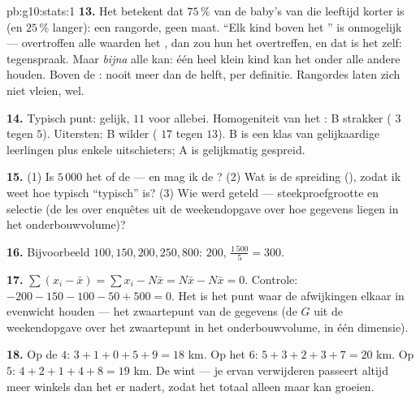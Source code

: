 \begin{solution}{pb:g10:stats:1}
\textbf{13.} Het betekent dat $75\,\%$ van de baby's van die leeftijd korter
is (en $25\,\%$ langer): een rangorde, geen maat. ``Elk kind boven het
'' is onmogelijk --- overtroffen alle waarden het , dan
zou hun  het  overtreffen, en dat is het zelf:
tegenspraak. Maar \emph{bijna} alle kan: één heel klein kind kan het
 onder alle andere houden. Boven de \emph{}: nooit meer dan
de helft, per definitie. Rangordes laten zich niet vleien,  wel.

\textbf{14.} Typisch punt: gelijk,  $11$ voor allebei. Homogeniteit
van het : B strakker ( $3$ tegen $5$). Uitersten:
B wilder ( $17$ tegen $13$). B is een klas van gelijkaardige
leerlingen plus enkele uitschieters; A is gelijkmatig gespreid.

\textbf{15.} (1) Is $5\,000$ het  of de  --- en mag ik de
? (2) Wat is de spreiding (), zodat ik weet hoe typisch
``typisch'' is? (3) Wie werd geteld --- steekproefgrootte en selectie (de les
over enquêtes uit de weekendopgave over hoe gegevens liegen in het
onderbouwvolume)?

\textbf{16.} Bijvoorbeeld $100, 150, 200, 250, 800$:  $200$,
 $\frac{1\,500}{5} = 300$.

\textbf{17.} $\sum (x_i - \bar x) = \sum x_i - N \bar x = N\bar x - N\bar x
= 0$. Controle: $-200 - 150 - 100 - 50 + 500 = 0$. Het  is het
punt waar de afwijkingen elkaar in evenwicht houden --- het zwaartepunt van
de gegevens (de $G$ uit de weekendopgave over het zwaartepunt in het
onderbouwvolume, in één dimensie).

\textbf{18.} Op de  $4$: $3 + 1 + 0 + 5 + 9 = 18$ km. Op het
 $6$: $5 + 3 + 2 + 3 + 7 = 20$ km. Op $5$:
$4 + 2 + 1 + 4 + 8 = 19$ km. De  wint --- je ervan verwijderen
passeert altijd meer winkels dan het er nadert, zodat het totaal alleen maar
kan groeien.


\end{solution}
